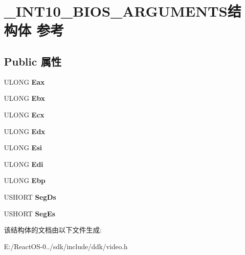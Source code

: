 \hypertarget{struct___i_n_t10___b_i_o_s___a_r_g_u_m_e_n_t_s}{}\section{\+\_\+\+I\+N\+T10\+\_\+\+B\+I\+O\+S\+\_\+\+A\+R\+G\+U\+M\+E\+N\+T\+S结构体 参考}
\label{struct___i_n_t10___b_i_o_s___a_r_g_u_m_e_n_t_s}
\subsection*{Public 属性}
\begin{DoxyCompactItemize}
\item 
\mbox{\label{struct___i_n_t10___b_i_o_s___a_r_g_u_m_e_n_t_s_a08119ed3f1dead66d14ced58a79e7013}} 
U\+L\+O\+NG {\bfseries Eax}
\item 
\mbox{\label{struct___i_n_t10___b_i_o_s___a_r_g_u_m_e_n_t_s_aedb98eef96a976157765a40d1e15beeb}} 
U\+L\+O\+NG {\bfseries Ebx}
\item 
\mbox{\label{struct___i_n_t10___b_i_o_s___a_r_g_u_m_e_n_t_s_a10c027c255ca86997674b9b972cb6f5d}} 
U\+L\+O\+NG {\bfseries Ecx}
\item 
\mbox{\label{struct___i_n_t10___b_i_o_s___a_r_g_u_m_e_n_t_s_a6de7f1dfb541b5ee74c6981aa8fc4ebc}} 
U\+L\+O\+NG {\bfseries Edx}
\item 
\mbox{\label{struct___i_n_t10___b_i_o_s___a_r_g_u_m_e_n_t_s_af97f46aa9616f58ec9a49d7e1dc02255}} 
U\+L\+O\+NG {\bfseries Esi}
\item 
\mbox{\label{struct___i_n_t10___b_i_o_s___a_r_g_u_m_e_n_t_s_a4c54daacd922f15ddf1a6cba42961851}} 
U\+L\+O\+NG {\bfseries Edi}
\item 
\mbox{\label{struct___i_n_t10___b_i_o_s___a_r_g_u_m_e_n_t_s_adddb778be4046b1c491a8c90c96d0a39}} 
U\+L\+O\+NG {\bfseries Ebp}
\item 
\mbox{\label{struct___i_n_t10___b_i_o_s___a_r_g_u_m_e_n_t_s_a2dcfdfadc19e821fa27c727306d2b0c3}} 
U\+S\+H\+O\+RT {\bfseries Seg\+Ds}
\item 
\mbox{\label{struct___i_n_t10___b_i_o_s___a_r_g_u_m_e_n_t_s_a1a8f16697fd02c67a6878eae499b1789}} 
U\+S\+H\+O\+RT {\bfseries Seg\+Es}
\end{DoxyCompactItemize}


该结构体的文档由以下文件生成\+:\begin{DoxyCompactItemize}
\item 
E\+:/\+React\+O\+S-\/0../sdk/include/ddk/video.\+h\end{DoxyCompactItemize}
